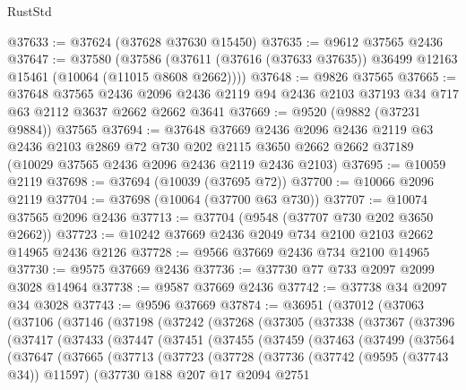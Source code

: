 \begin{lexlean}{RustStd}
\begin{coremodule}
@37633 := @37624 (@37628 @37630 @15450)
@37635 := @9612 @37565 @2436
@37647 := @37580
    (@37586 (@37611 (@37616 (@37633 @37635)) @36499 @12163 @15461 (@10064 (@11015 @8608 @2662))))
@37648 := @9826 @37565
@37665 := @37648
    @37565
    @2436
    @2096
    @2436
    @2119
    @94
    @2436
    @2103
    @37193
    @34
    @717
    @63
    @2112
    @3637
    @2662
    @2662
    @3641
@37669 := @9520 (@9882 (@37231 @9884)) @37565
@37694 := @37648
    @37669
    @2436
    @2096
    @2436
    @2119
    @63
    @2436
    @2103
    @2869
    @72
    @730
    @202
    @2115
    @3650
    @2662
    @2662
    @37189
    (@10029 @37565 @2436 @2096 @2436 @2119 @2436 @2103)
@37695 := @10059 @2119
@37698 := @37694 (@10039 (@37695 @72))
@37700 := @10066 @2096 @2119
@37704 := @37698 (@10064 (@37700 @63 @730))
@37707 := @10074 @37565 @2096 @2436
@37713 := @37704 (@9548 (@37707 @730 @202 @3650 @2662))
@37723 := @10242 @37669 @2436 @2049 @734 @2100 @2103 @2662 @14965 @2436 @2126
@37728 := @9566 @37669 @2436 @734 @2100 @14965
@37730 := @9575 @37669 @2436
@37736 := @37730 @77 @733 @2097 @2099 @3028 @14964
@37738 := @9587 @37669 @2436
@37742 := @37738 @34 @2097 @34 @3028
@37743 := @9596 @37669
@37874 := @36951
    (@37012
      (@37063
        (@37106
          (@37146
            (@37198
              (@37242
                (@37268
                  (@37305
                    (@37338
                      (@37367
                        (@37396
                          (@37417
                            (@37433
                              (@37447
                                (@37451
                                  (@37455
                                    (@37459
                                      (@37463
                                        (@37499
                                          (@37564
                                            (@37647
                                              (@37665
                                                (@37713
                                                  (@37723
                                                    (@37728
                                                      (@37736
                                                        (@37742 (@9595 (@37743 @34)) @11597)
                                                        (@37730
                                                          @188
                                                          @207
                                                          @17
                                                          @2094
                                                          @2751

\end{coremodule}
\end{lexlean}
